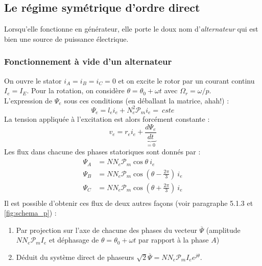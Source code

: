 	
	\subsection{Le régime symétrique d'ordre direct}
	Lorsqu'elle fonctionne en générateur, elle porte le doux nom d'\textit{alternateur} 
	qui est bien une source de puissance électrique.
	
		\subsubsection{Fonctionnement à vide d'un alternateur}
		On ouvre le stator $i_A=i_B=i_C=0$ et on excite le rotor par un courant 
		continu $I_e=I_E$. Pour la rotation, on considère $\theta=\theta_0+\omega t$ 
		avec $\Omega_r = \omega/p$.\\
		L'expression de $\Psi_e$ sous ces conditions (en déballant la matrice, ahah!) :
		\begin{equation}
		\Psi_e = l_ei_e + N_e^2\mathcal{P}_mi_e =\ cste
		\end{equation}
		La tension appliquée à l'excitation est alors forcément constante :
		\begin{equation}
		v_e = r_ei_e + \underbrace{\dfrac{d\Psi_e}{dt}}_{=0}
		\end{equation}
		Les flux dans chacune des phases statoriques sont donnés par :
		\begin{equation}
		\begin{array}{ll}
		\Psi_A &= NN_e\mathcal{P}_m\cos\theta\ i_e\\
		\Psi_B &= NN_e\mathcal{P}_m\cos(\theta-\frac{2\pi}{3})\ i_e\\
		\Psi_C &= NN_e\mathcal{P}_m\cos(\theta+\frac{2\pi}{3})\ i_e\\
		\end{array}
		\end{equation}
		Il est possible d'obtenir ces flux de deux autres façons (voir paragraphe 5.1.3 et 
		\autoref{fig:schema_p}) :
		\begin{enumerate}
		\item Par projection sur l'axe de chacune des phases du vecteur $\overline{\Psi}$ 
		(amplitude $NN_e\mathcal{P}_mI_e$ et déphasage de $\theta=\theta_0+\omega t$ par 
		rapport à la phase $A$)
		\item Déduit du système direct de phaseurs $\sqrt{2}\overline{\Psi} = NN_e
		\mathcal{P}_mI_ee^{j\theta}$.
		\end{enumerate}
		
